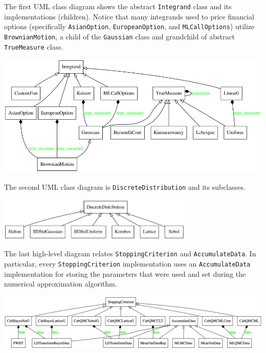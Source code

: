 The first UML class diagram shows the abstract \texttt{Integrand} class and its implementations (children). Notice that many integrands used to  price financial options (specifically \texttt{AsianOption}, \texttt{EuropeanOption}, and \texttt{MLCallOptions}) utilize \texttt{BrownianMotion}, a child of the \texttt{Gaussian} class and grandchild of abstract \texttt{TrueMeasure} class.  
 
\begin{center}
\includegraphics[width=1\textwidth]{uml/qmcpy_uml1.png}      
\end{center}   

The second UML class diagram is \texttt{DiscreteDistribution} and its subclasses.

\begin{center}
\includegraphics[width=0.7\textwidth]{uml/qmcpy_uml2.png}      
\end{center} 

The last high-level diagram relates \texttt{StoppingCriterion} and \texttt{AccumulateData}. In particular, every \texttt{StoppingCriterion} implementation uses an \texttt{AccumulateData} implementation for storing the parameters that were used and set during the numerical approximation algorithm.  

\begin{center}
\includegraphics[width=1\textwidth]{uml/qmcpy_blog_uml3.png}      
\end{center} 


